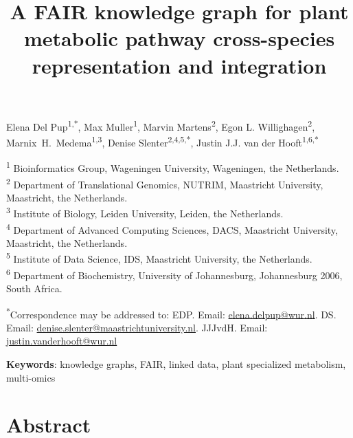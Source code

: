 \documentclass[11pt,a4paper]{article}
\title{\vspace{-2em}\bfseries A FAIR knowledge graph for plant metabolic pathway cross-species
representation and integration}
\date{}
\begin{document}
\maketitle
\vspace{-3em}

\begin{center}
Elena Del Pup\textsuperscript{1,*},
Max Muller\textsuperscript{1},
Marvin Martens\textsuperscript{2},
Egon L. Willighagen\textsuperscript{2},
Marnix~H.~Medema\textsuperscript{1,3},
Denise Slenter\textsuperscript{2,4,5,*},
Justin J.J. van der Hooft\textsuperscript{1,6,*}
\end{center}

\vspace{0.5em}
\noindent\footnotesize
\textsuperscript{1} Bioinformatics Group, Wageningen University, Wageningen, the Netherlands.\\
\textsuperscript{2} Department of Translational Genomics, NUTRIM, Maastricht University, Maastricht, the Netherlands.\\
\textsuperscript{3} Institute of Biology, Leiden University, Leiden, the Netherlands.\\
\textsuperscript{4} Department of Advanced Computing Sciences, DACS, Maastricht University, Maastricht, the Netherlands.\\
\textsuperscript{5} Institute of Data Science, IDS, Maastricht University, the Netherlands.\\
\textsuperscript{6} Department of Biochemistry, University of Johannesburg, Johannesburg 2006, South Africa.

\vspace{0.5em}
\noindent\textsuperscript{*}Correspondence may be addressed to: EDP. Email: \href{mailto:elena.delpup@wur.nl}{elena.\allowbreak{}delpup@\allowbreak{}wur.nl}.
DS. Email: \href{mailto:denise.slenter@maastrichtuniversity.nl}{denise.\allowbreak{}slenter@\allowbreak{}maastrichtuniversity.\allowbreak{}nl}.
JJJvdH. Email: \href{mailto:justin.vanderhooft@wur.nl}{justin.vanderhooft@wur.nl}
\normalsize

\vspace{1em}
\noindent\textbf{Keywords}: knowledge graphs, FAIR, linked data, plant specialized metabolism, multi-omics

\vspace{1.5em}

\section*{Abstract}
\end{document}
